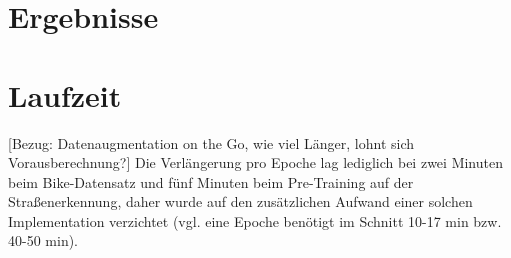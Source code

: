 \chapter{Ergebnisse} \label{sec:results}

\chapter{Laufzeit}

[Bezug: Datenaugmentation on the Go, wie viel Länger, lohnt sich Vorausberechnung?]
Die Verlängerung pro Epoche lag lediglich bei zwei Minuten beim Bike-Datensatz und fünf Minuten beim Pre-Training auf der 
Straßenerkennung, daher wurde auf den zusätzlichen Aufwand einer solchen Implementation verzichtet 
(vgl. eine Epoche benötigt im Schnitt 10-17 min bzw. 40-50 min). 





		

